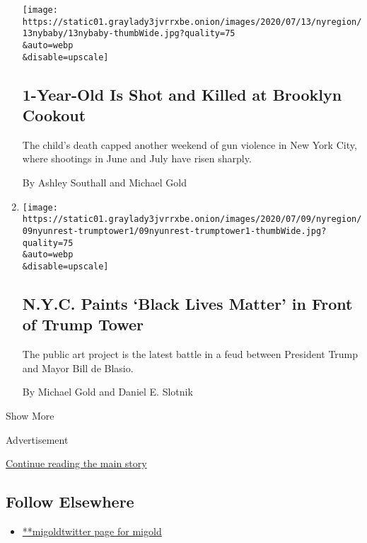 \begin{enumerate}
  \texttt{[image: https://static01.graylady3jvrrxbe.onion/images/2020/07/13/nyregion/13nybaby/13nybaby-thumbWide.jpg?quality=75\\\&auto=webp\\\&disable=upscale]}

  \hypertarget{1-year-old-is-shot-and-killed-at-brooklyn-cookout}{%
  \subsection{1-Year-Old Is Shot and Killed at Brooklyn
  Cookout}\label{1-year-old-is-shot-and-killed-at-brooklyn-cookout}}

  The child's death capped another weekend of gun violence in New York
  City, where shootings in June and July have risen sharply.

  By Ashley Southall and Michael Gold
\item
  \href{/2020/07/09/nyregion/blm-trump-tower.html}{}

  \texttt{[image: https://static01.graylady3jvrrxbe.onion/images/2020/07/09/nyregion/09nyunrest-trumptower1/09nyunrest-trumptower1-thumbWide.jpg?quality=75\\\&auto=webp\\\&disable=upscale]}

  \hypertarget{nyc-paints-black-lives-matter-in-front-of-trump-tower}{%
  \subsection{N.Y.C. Paints `Black Lives Matter' in Front of Trump
  Tower}\label{nyc-paints-black-lives-matter-in-front-of-trump-tower}}

  The public art project is the latest battle in a feud between
  President Trump and Mayor Bill de Blasio.

  By Michael Gold and Daniel E. Slotnik
\end{enumerate}

Show More

Advertisement

\protect\hyperlink{after-mid2}{Continue reading the main story}

\hypertarget{follow-elsewhere}{%
\subsection{Follow Elsewhere}\label{follow-elsewhere}}

\begin{itemize}
\tightlist
\item
  \href{https://twitter.com/migold}{**migoldtwitter page for migold}
\end{itemize}


